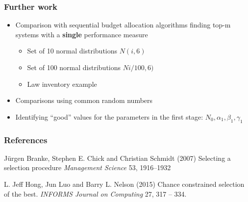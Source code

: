 \documentclass[aspectratio=169]{beamer}
\begin{document}

\begin{frame}
\frametitle{Further work}

\begin{itemize}
    \item Comparison with sequential budget allocation algorithms finding top-m systems with a \textbf{single} performance measure
    \begin{itemize}
        \item Set of 10 normal distributions $N(i,6)$
        \item Set of 100 normal distributions $Ni/100,6)$
        \item Law inventory example
    \end{itemize}
    \item Comparisons using common random numbers
    \item Identifying ``good'' values for the parameters in the first stage: $N_{0}, \alpha_{1}, \beta_{1}, \gamma_{1}$
\end{itemize}
    

\end{frame}







\begin{frame}
\frametitle{References}
\footnotesize{
\begin{thebibliography}{99} %
J\"{u}rgen Branke, Stephen E. Chick and Christian Schmidt (2007)
\newblock Selecting a selection procedure
\newblock \emph{Management Science} 53, 1916--1932

L. Jeff Hong, Jun Luo and Barry L. Nelson (2015)
\newblock Chance constrained selection of the best.
\newblock \emph{INFORMS Journal on Computing}
27, 317 -- 334.



\end{thebibliography}
}
\end{frame}

\end{document}
